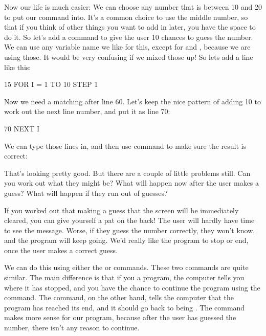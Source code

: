 
\needspace{3cm}
Now our life is much easier: We can choose any  number that is between
10 and 20 to put our  command into.  It's a common choice to
use the middle number, so that if you think of other things you want
to add in later, you have the space to do it.  So let's add a
 command to give the user 10 chances to guess the number.  We
can use any variable name we like for this, except for  and
, because we are using those. It would be very confusing if we
mixed those up!  So lets add a line like this:

\begin{screenoutput}
15 FOR I = 1 TO 10 STEP 1
\end{screenoutput}

\needspace{3cm}
Now we need a matching  after line 60.  Let's keep the
nice pattern of adding 10 to work out the next line number, and put it
as line 70:

\begin{screenoutput}
70 NEXT I
\end{screenoutput}

\needspace{4cm}
We can type those lines in, and then use  command to make
sure the result is correct:


That's looking pretty good.  But there are a couple of little problems still.
Can you work out what they might be? What will happen now after the user makes a guess?
What will happen if they run out of guesses?

If you worked out that making a guess that the screen will be
immediately cleared, you can give yourself a pat on the back! The user
will hardly have time to see the message. Worse, if they guess the
number correctly, they won't know, and the program will keep going.
We'd really like the program to stop or end, once the user makes a
correct guess.

We can do this using either the  or
 commands.  These two commands are quite similar.  The main
difference is that if you  a program, the computer tells
you where it has stopped, and you have the chance to continue the
program using the  command.  The  command, on the
other hand, tells the computer that the program has reached its end,
and it should go back to being .  The  command
makes more sense for our program, because after the user has guessed
the number, there isn't any reason to continue.

